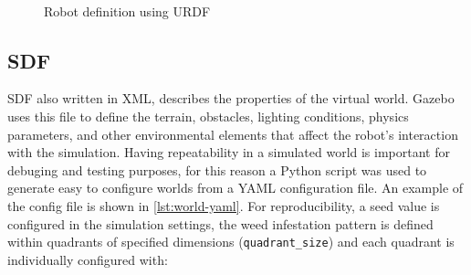 \begin{figure}[hbt]
    \myfloatalign
     \quad
     \\
    \caption[Robot definition using URDF]{Robot definition using URDF}
\end{figure}

\subsection{SDF}
\ac{SDF} also written in XML, describes the properties of the virtual world. Gazebo uses this file to define the terrain, obstacles, lighting conditions, physics parameters, and other environmental elements that affect the robot’s interaction with the simulation. Having repeatability in a simulated world is important for debuging and testing purposes, for this reason a Python script was used to generate easy to configure worlds from a YAML configuration file. An example of the config file is shown in \autoref{lst:world-yaml}. For reproducibility, a seed value is configured in the simulation settings, the weed infestation pattern is defined within quadrants of specified dimensions (\texttt{quadrant\_size}) and each quadrant is individually configured with:

